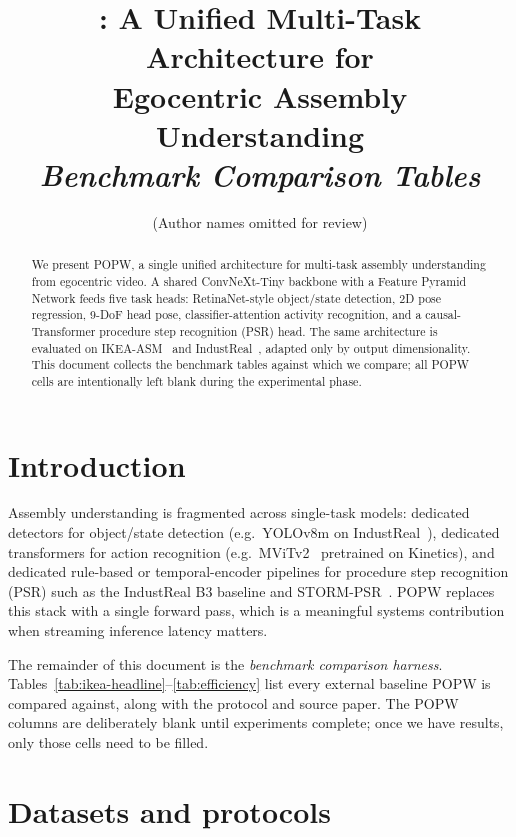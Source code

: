 \documentclass[11pt,a4paper]{article}
\title{\popw{}: A Unified Multi-Task Architecture for\\
       Egocentric Assembly Understanding\\
       \textit{Benchmark Comparison Tables}}
\author{(Author names omitted for review)}
\date{}
\newcommand{\popw}{POPW}
\newcommand{\ikea}{IKEA-ASM}
\newcommand{\industreal}{IndustReal}
\begin{document}
\maketitle

\begin{abstract}
We present \popw{}, a single unified architecture for multi-task assembly understanding from egocentric video.
A shared ConvNeXt-Tiny backbone with a Feature Pyramid Network feeds five task heads:
RetinaNet-style object/state detection, 2D pose regression, 9-DoF head pose,
classifier-attention activity recognition, and a causal-Transformer procedure step recognition (PSR) head.
The same architecture is evaluated on \ikea{}~\cite{benshabat2021ikea} and \industreal{}~\cite{schoonbeek2024industreal},
adapted only by output dimensionality.
This document collects the benchmark tables against which we compare; all \popw{} cells are
intentionally left blank during the experimental phase.
\end{abstract}

\section{Introduction}
\label{sec:intro}

Assembly understanding is fragmented across single-task models: dedicated detectors
for object/state detection (e.g.\ YOLOv8m on \industreal{}~\cite{schoonbeek2024industreal}),
dedicated transformers for action recognition (e.g.\ MViTv2~\cite{schoonbeek2024industreal} pretrained on Kinetics),
and dedicated rule-based or temporal-encoder pipelines for procedure step recognition (PSR)
such as the \industreal{} B3 baseline and STORM-PSR~\cite{schoonbeek2025storm}.
\popw{} replaces this stack with a single forward pass, which is a meaningful systems contribution
when streaming inference latency matters.

The remainder of this document is the \emph{benchmark comparison harness}.
Tables~\ref{tab:ikea-headline}--\ref{tab:efficiency} list every external baseline
\popw{} is compared against, along with the protocol and source paper.
The \popw{} columns are deliberately blank until experiments complete;
once we have results, only those cells need to be filled.

\section{Datasets and protocols}
\label{sec:datasets}
\end{document}
